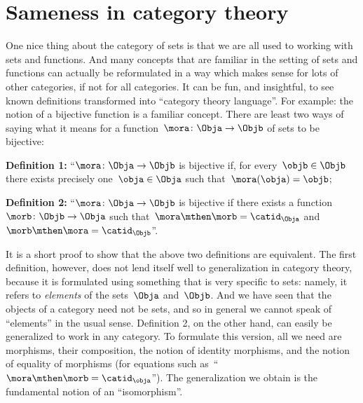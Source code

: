 \label{sec:attributes_sameness}


\section{Sameness in category theory}

One nice thing about the category of sets is that we are all used to working with sets and functions. And many concepts that are familiar in the setting of sets and functions can actually be reformulated in a way which makes sense for lots of other categories, if not for all categories. It can be fun, and insightful, to see known definitions transformed into ``category theory language''. For example: the notion of a bijective function is a familiar concept. There are least two ways of saying what it means for a function~$\mora \colon \Obja \to \Objb$ of sets to be bijective:

\textbf{Definition 1:} ``$\mora \colon \Obja \to \Objb$ is bijective if, for every~$\objb \in \Objb$ there exists precisely one~$\obja \in \Obja$ such that~$\mora(\obja) = \objb$;


\textbf{Definition 2:} ``$\mora\colon \Obja \to \Objb$ is bijective if there exists a function~$\morb\colon \Objb \to \Obja$ such that~$\mora \mthen \morb = \catid_\Obja$ and~$\morb \mthen \mora = \catid_\Objb$''.


It is a short proof to show that the above two definitions are equivalent. The first definition, however, does not lend itself well to generalization in category theory, because it is formulated using something that is very specific to sets: namely, it refers to \emph{elements} of the sets~$\Obja$ and~$\Objb$. And we have seen that the objects of a category need not be sets, and so in general we cannot speak of ``elements'' in the usual sense. Definition 2, on the other hand, can easily be generalized to work in any category. To formulate this version, all we need are morphisms, their composition, the notion of identity morphisms, and the notion of equality of morphisms (for equations such as~``$\mora \mthen \morb = \catid_\obja$''). The generalization we obtain is the fundamental notion of an ``isomorphism''.



